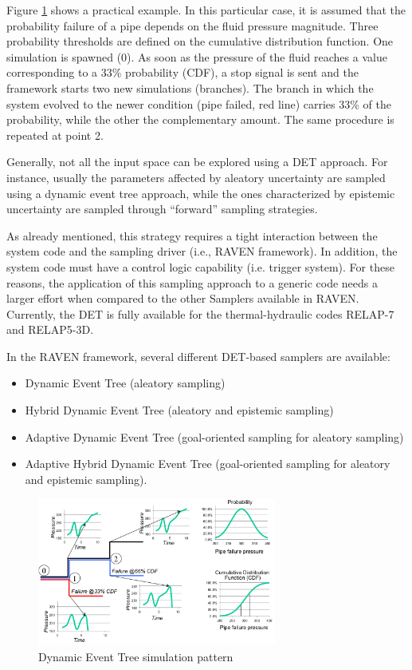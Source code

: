 Figure \ref{fig:DETschemeExample} shows a practical example. In this particular case, it is assumed that the 
probability failure of a pipe depends on the fluid pressure magnitude. Three probability thresholds are defined on 
the cumulative distribution function. One simulation is spawned (0). As soon as the pressure of the fluid reaches a 
value corresponding to a 33\% probability (CDF), a stop signal is sent and the framework starts two new 
simulations (branches). The branch in which the system evolved to the newer condition (pipe failed, red line) 
carries 33\% of the probability, while the other the complementary amount. The same procedure is repeated at 
point 2.

Generally, not all the input space can be explored using a DET approach. For instance, usually the parameters affected by aleatory uncertainty are sampled using a dynamic event tree approach, while the ones characterized by epistemic uncertainty are sampled through ``forward'' sampling strategies. 

As already mentioned, this strategy requires a tight interaction between the system code and the sampling driver (i.e., RAVEN framework). In addition, the system code must have a control logic capability (i.e. trigger system). For these reasons, the application of this sampling approach to a generic code needs a larger effort when compared to the other Samplers available in RAVEN. Currently, the DET is fully available for the thermal-hydraulic codes RELAP-7 and RELAP5-3D.

In the RAVEN framework, several different DET-based samplers are available:
\begin{itemize}
\item Dynamic Event Tree (aleatory sampling)
\item Hybrid Dynamic Event Tree (aleatory and epistemic sampling)
\item Adaptive Dynamic Event Tree (goal-oriented sampling for aleatory sampling)
\item Adaptive Hybrid Dynamic Event Tree (goal-oriented sampling for aleatory and epistemic sampling).
\end{itemize}

\begin{figure}
  \centering
  \includegraphics[width=0.7\textwidth]  {pics/DETscheme.png}
  \caption{Dynamic Event Tree simulation pattern}
  \label{fig:DETschemeExample}
\end{figure}

